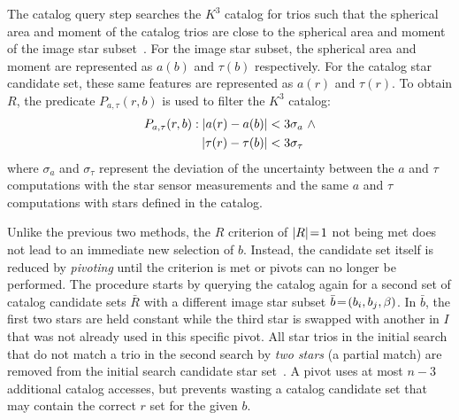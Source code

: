 The catalog query step searches the $K^3$ catalog for trios such that the spherical area and moment of the catalog trios
are close to the spherical area and moment of the image star subset~\cite{coleAndCrassidis:sphericalTriangleMethod}.
For the image star subset, the spherical area and moment are represented as $a(b)$ and $\tau(b)$ respectively.
For the catalog star candidate set, these same features are represented as $a(r)$ and $\tau(r)$.
To obtain $R$, the predicate $P_{a, \tau}(r, b)$ is used to filter the $K^3$ catalog:
\begin{equation}
    \begin{aligned}
        P_{a, \tau}(r, b) : \left|  a(r) - a(b) \right| &< 3\sigma_{a}
        \ \land \\ \left| \tau(r) - \tau(b) \right| &< 3\sigma_{\tau}
    \end{aligned}
\end{equation}
where $\sigma_{a}$ and $\sigma_{\tau}$ represent the deviation of the uncertainty between the $a$ and $\tau$
computations with the star sensor measurements and the same $a$ and $\tau$ computations with stars defined in the
catalog.

Unlike the previous two methods, the $R$ criterion of $|R| \!=\! 1$ not being met does not lead to an immediate new
selection of $b$.
Instead, the candidate set itself is reduced by \textit{pivoting} until the criterion is met or pivots can no longer
be performed.
The procedure starts by querying the catalog again for a second set of catalog candidate sets $\bar{R}$ with a
different image star subset $\bar{b} \!=\! \left(b_i, b_j, \beta\right)$.
In $\bar{b}$, the first two stars are held constant while the third star is swapped with another in $I$ that was not
already used in this specific pivot.
All star trios in the initial search that do not match a trio in the second search by \textit{two stars} (a partial
match) are removed from the initial search candidate star set~\cite{coleAndCrassidis:sphericalTriangleMethod}.
A pivot uses at most $n - 3$ additional catalog accesses, but prevents wasting a catalog candidate set that may contain
the correct $r$ set for the given $b$.

